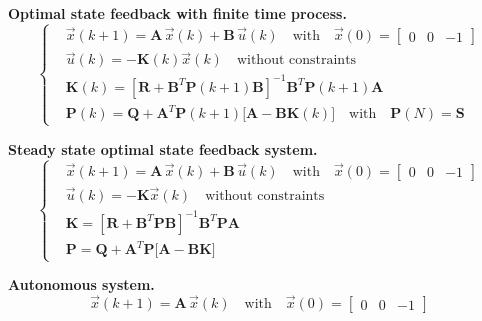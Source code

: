 \documentclass[11pt,a4paper,oneside]{book}
\numberwithin{equation}{section}
\theoremstyle{it}
\theoremstyle{definition}
\begin{document}
\noindent\textbf{Optimal state feedback with finite time process.}
\begin{equation}
	\left\lbrace \begin{aligned}
		& \vec{x}(k+1)=\mathbf{A}\,\vec{x}(k)+\mathbf{B}\,\vec{u}(k) \quad 
		\text{with} \quad \vec{x}(0) = \begin{bmatrix} 0&0&-1\end{bmatrix}  
		\\[6pt]
		& \vec{u}(k) = -\mathbf{K}(k)\vec{x}(k) \quad \text{without 
			constraints}\\[6pt]
		& \mathbf{K}(k) = \left[ 
		\mathbf{R}+\mathbf{B}^T\mathbf{P}(k+1)\mathbf{B}\right]^{-1}\mathbf{B}^T\mathbf{P}(k+1)
		\mathbf{A} \\[6pt]
		& \mathbf{P}(k) =\mathbf{Q}+\mathbf{A}^T\mathbf{P}(k+1)\Big[ 
		\mathbf{A} -\mathbf{B}\mathbf{K}(k)\Big] \quad \text{with} \quad 
		\mathbf{P}(N) =\mathbf{S}
	\end{aligned}\right. 
\end{equation}
\vspace{10mm}

\noindent\textbf{Steady state optimal state feedback system.}
\begin{equation}
	\left\lbrace \begin{aligned}
		& \vec{x}(k+1)=\mathbf{A}\,\vec{x}(k)+\mathbf{B}\,\vec{u}(k) \quad 
		\text{with} \quad \vec{x}(0) = \begin{bmatrix} 0&0&-1\end{bmatrix}  
		\\[6pt]
		& \vec{u}(k) = -\mathbf{K}\vec{x}(k) \quad \text{without 
			constraints}\\[6pt]
		& \mathbf{K} = \left[ 
		\mathbf{R}+\mathbf{B}^T\mathbf{P}\mathbf{B}\right]^{-1}\mathbf{B}^T\mathbf{P}
		\mathbf{A} \\[6pt]
		& \mathbf{P} =\mathbf{Q}+\mathbf{A}^T\mathbf{P}\Big[\mathbf{A} 
		-\mathbf{B}\mathbf{K}\Big]
	\end{aligned}\right. 
\end{equation}
\vspace{10mm}

\noindent\textbf{Autonomous system.}
\begin{equation}
	\vec{x}(k+1)=\mathbf{A}\,\vec{x}(k) \quad \text{with} \quad \vec{x}(0) = 
	\begin{bmatrix} 0&0&-1\end{bmatrix}
\end{equation}
\vspace{10mm}
\end{document}
